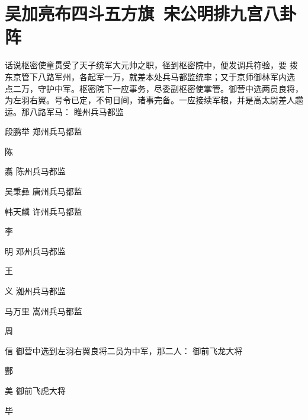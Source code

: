\chapter{吴加亮布四斗五方旗~宋公明排九宫八卦阵}

话说枢密使童贯受了天子统军大元帅之职，径到枢密院中，便发调兵符验，要
拨东京管下八路军州，各起军一万，就差本处兵马都监统率；又于京师御林军内选
点二万，守护中军。枢密院下一应事务，尽委副枢密使掌管。御营中选两员良将，
为左羽右翼。号令已定，不旬日间，诸事完备。一应接续军粮，并是高太尉差人趱
运。那八路军马：
睢州兵马都监

段鹏举
郑州兵马都监

陈

翥
陈州兵马都监

吴秉彝
唐州兵马都监

韩天麟
许州兵马都监

李

明
邓州兵马都监

王

义
洳州兵马都监

马万里
嵩州兵马都监

周

信
御营中选到左羽右翼良将二员为中军，那二人：
御前飞龙大将

酆

美
御前飞虎大将

毕

